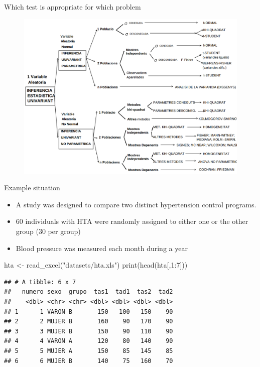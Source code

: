 \documentclass[
  ignorenonframetext,
]{beamer}
\newenvironment{Shaded}{\begin{snugshade}}{\end{snugshade}}
\newcommand{\DecValTok}[1]{\textcolor[rgb]{0.00,0.00,0.81}{#1}}
\newcommand{\FunctionTok}[1]{\textcolor[rgb]{0.00,0.00,0.00}{#1}}
\newcommand{\NormalTok}[1]{#1}
\newcommand{\OtherTok}[1]{\textcolor[rgb]{0.56,0.35,0.01}{#1}}
\newcommand{\SpecialCharTok}[1]{\textcolor[rgb]{0.00,0.00,0.00}{#1}}
\newcommand{\StringTok}[1]{\textcolor[rgb]{0.31,0.60,0.02}{#1}}
\providecommand{\tightlist}{%
  \setlength{\itemsep}{0pt}\setlength{\parskip}{0pt}}
\begin{document}
\begin{frame}{Which test is appropriate for which problem}
\protect\hypertarget{which-test-is-appropriate-for-which-problem}{}
\begin{figure}
\includegraphics[width=0.8\linewidth]{images/testsXCadaSituacio} \end{figure}
\end{frame}

\begin{frame}{Example situation}
\protect\hypertarget{example-situation}{}
\begin{itemize}
\tightlist
\item
  A study was designed to compare two distinct hypertension control
  programs.
\item
  60 individuals with HTA were randomly assigned to either one or the
  other group (30 per group)
\item
  Blood pressure was measured each month during a year
\end{itemize}
\end{frame}

\begin{frame}[fragile]
\begin{Shaded}
\begin{Highlighting}[]
\NormalTok{hta }\OtherTok{\textless{}{-}} \FunctionTok{read\_excel}\NormalTok{(}\StringTok{"datasets/hta.xls"}\NormalTok{)}
\FunctionTok{print}\NormalTok{(}\FunctionTok{head}\NormalTok{(hta[,}\DecValTok{1}\SpecialCharTok{:}\DecValTok{7}\NormalTok{]))}
\end{Highlighting}
\end{Shaded}

\begin{verbatim}
## # A tibble: 6 x 7
##   numero sexo  grupo  tas1  tad1  tas2  tad2
##    <dbl> <chr> <chr> <dbl> <dbl> <dbl> <dbl>
## 1      1 VARON B       150   100   150    90
## 2      2 MUJER B       160    90   170    90
## 3      3 MUJER B       150    90   110    90
## 4      4 VARON A       120    80   140    90
## 5      5 MUJER A       150    85   145    85
## 6      6 MUJER B       140    75   160    70
\end{verbatim}
\end{frame}
\end{document}
